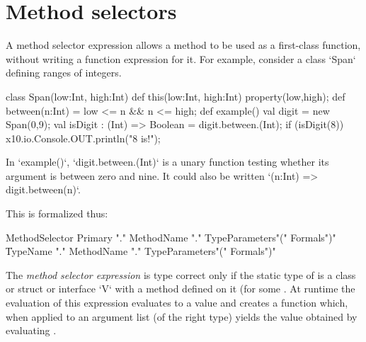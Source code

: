 
\section{Method selectors}
\label{MethodSelectors}

A method selector expression allows a method to be used as a
first-class function, without writing a function expression for it.
For example, consider a class \xcd`Span` defining ranges of integers.  

\begin{xten}
class Span(low:Int, high:Int) {
  def this(low:Int, high:Int) {property(low,high);}
  def between(n:Int) = low <= n && n <= high;
  def example() {
    val digit = new Span(0,9);
    val isDigit : (Int) => Boolean = digit.between.(Int);
    if (isDigit(8)) x10.io.Console.OUT.println("8 is!");
  }
}
\end{xten}
%
\noindent


In \xcd`example()`, 
\xcd`digit.between.(Int)` 
is a unary function testing whether its argument is between zero
and nine.  It could also be written 
\xcd`(n:Int) => digit.between(n)`.

This is formalized thus:

\begin{grammar}
MethodSelector \:
        Primary \xcd"."
        MethodName \xcd"."
                TypeParameters\opt \xcd"(" Formals\opt \xcd")" \\
      \|
        TypeName \xcd"."
        MethodName \xcd"."
                TypeParameters\opt \xcd"(" Formals\opt \xcd")" \\
\end{grammar}

The \emph{method selector expression}  is type
correct only if  the static type of  is a
class or struct or interface \xcd`V` with a method
 defined on it (for some
. At runtime the evaluation of this expression
evaluates  to a value  and creates a function 
which, when applied to an argument list  (of the right
type) yields the value obtained by evaluating .

